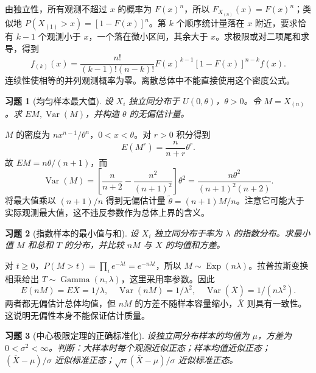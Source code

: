 \documentclass[12pt,fontset=fandol]{ctexart}
\newtheorem{exercise}{习题}[section]
\begin{document}
\begin{solve}\label{a:B8.7}由独立性，所有观测不超过 $x$ 的概率为 $F(x)^n$，所以 $F_{X_{(n)}}(x)=F(x)^n$；类似地 $P(X_{(1)}>x)=[1-F(x)]^n$。第 $k$ 个顺序统计量落在 $x$ 附近，要求恰有 $k-1$ 个观测小于 $x$，一个落在微小区间，其余大于 $x$。求极限或对二项尾和求导，得到\[f_{(k)}(x)=\frac{n!}{(k-1)!(n-k)!}F(x)^{k-1}[1-F(x)]^{n-k}f(x).\]连续性使相等的并列观测概率为零。离散总体中不能直接使用这个密度公式。\end{solve}

\begin{exercise}[均匀样本最大值]\label{q:B8.8}
设 $X_i$ 独立同分布于 $U(0,\theta)$，$\theta>0$。令 $M=X_{(n)}$。求 $EM,\operatorname{Var}(M)$，并构造 $\theta$ 的无偏估计量。\par{}
\end{exercise}

\begin{solve}\label{a:B8.8}$M$ 的密度为 $nx^{n-1}/\theta^n$，$0<x<\theta$。对 $r>0$ 积分得到\[E(M^r)=\frac{n}{n+r}\theta^r.\]故 $EM=n\theta/(n+1)$，而\[\operatorname{Var}(M)=\left[\frac{n}{n+2}-\frac{n^2}{(n+1)^2}\right]\theta^2=\frac{n\theta^2}{(n+1)^2(n+2)}.\]将最大值乘以 $(n+1)/n$ 得到无偏估计量 $\widetilde\theta=(n+1)M/n$。注意它可能大于实际观测最大值，这不违反参数作为总体上界的含义。\end{solve}

\begin{exercise}[指数样本的最小值与和]\label{q:B8.9}
设 $X_i$ 独立同分布于率为 $\lambda$ 的指数分布。求最小值 $M$ 和总和 $T$ 的分布，并比较 $nM$ 与 $\overline X$ 的均值和方差。\par{}
\end{exercise}

\begin{solve}\label{a:B8.9}对 $t\ge0$，$P(M>t)=\prod_i e^{-\lambda t}=e^{-n\lambda t}$，所以 $M\sim\operatorname{Exp}(n\lambda)$。拉普拉斯变换相乘给出 $T\sim\operatorname{Gamma}(n,\lambda)$，这里采用率参数。因此\[E(nM)=E\overline X=1/\lambda,\quad\operatorname{Var}(nM)=1/\lambda^2,\quad\operatorname{Var}(\overline X)=1/(n\lambda^2).\]两者都无偏估计总体均值，但 $nM$ 的方差不随样本容量缩小，$\overline X$ 则具有一致性。这说明无偏性本身不能保证估计质量。\end{solve}

\begin{exercise}[中心极限定理的正确标准化]\label{q:M-F-C13}
设独立同分布样本的均值为 $\mu$，方差为 $0<\sigma^2<\infty$。判断：大样本时每个观测近似正态；样本均值近似正态；$(\overline X-\mu)/\sigma$ 近似标准正态；$\sqrt n(\overline X-\mu)/\sigma$ 近似标准正态。\par{}
\end{exercise}
\end{document}
